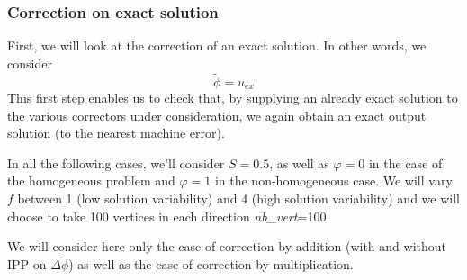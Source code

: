 \subsubsection{Correction on exact solution} \label{Corr.results.ana}

First, we will look at the correction of an exact solution. In other words, we consider
\begin{equation*}
	\tilde{\phi}=u_{ex}
\end{equation*}
This first step enables us to check that, by supplying an already exact solution to the various correctors under consideration, we again obtain an exact output solution (to the nearest machine error).

In all the following cases, we'll consider $S=0.5$, as well as $\varphi=0$ in the case of the homogeneous problem and $\varphi=1$ in the non-homogeneous case. We will vary $f$ between 1 (low solution variability) and 4 (high solution variability) and we will choose to take 100 vertices in each direction \textit{nb\_vert}=100.

\begin{Rem}
	We will consider here only the case of correction by addition (with and without IPP on $\Delta\tilde{\phi}$) as well as the case of correction by multiplication.
\end{Rem}

